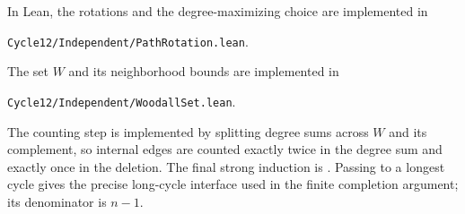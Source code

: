In Lean, the rotations and the degree-maximizing choice are implemented in
\begin{center}\small\nolinkurl{Cycle12/Independent/PathRotation.lean}.\end{center}
The set $W$ and its neighborhood bounds are implemented in
\begin{center}\small\nolinkurl{Cycle12/Independent/WoodallSet.lean}.\end{center}
The counting step is implemented by splitting degree sums across $W$ and
its complement, so internal edges are counted exactly twice in the degree
sum and exactly once in the deletion. The final strong induction is
. Passing to a longest cycle
gives the precise long-cycle interface used in the finite completion
argument; its denominator is $n-1$.

